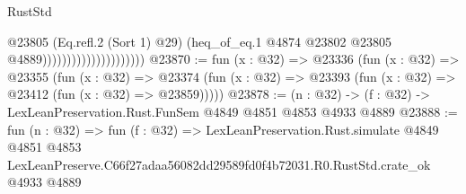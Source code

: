 \begin{lexlean}{RustStd}
\begin{coremodule}
                                            @23805
                                            (Eq.refl.{2} (Sort 1) @29)
                                            (heq_of_eq.{1}
                                              @4874
                                              @23802
                                              @23805
                                              @4889)))))))))))))))))))))
@23870 := fun (x : @32) =>
  @23336
    (fun (x : @32) =>
    @23355
      (fun (x : @32) =>
      @23374 (fun (x : @32) => @23393 (fun (x : @32) => @23412 (fun (x : @32) => @23859)))))
@23878 := (n : @32) -> (f : @32) -> LexLeanPreservation.Rust.FunSem @4849 @4851 @4853 @4933 @4889
@23888 := fun (n : @32) =>
  fun (f : @32) =>
  LexLeanPreservation.Rust.simulate
    @4849
    @4851
    @4853
    LexLeanPreserve.C66f27adaa56082dd29589fd0f4b72031.R0.RustStd.crate_ok
    @4933
    @4889
\end{coremodule}
\end{lexlean}
